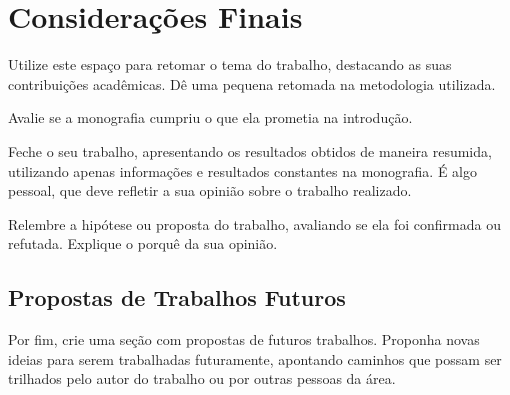 \chapter{Considerações Finais}\label{consideracoesfinais}

Utilize este espaço para retomar o tema do trabalho, destacando as suas contribuições acadêmicas. Dê uma pequena retomada na metodologia utilizada.

Avalie se a monografia cumpriu o que ela prometia na introdução. 

Feche o seu trabalho, apresentando os resultados obtidos de maneira resumida, utilizando apenas informações e resultados constantes na monografia. É algo pessoal, que deve refletir a sua opinião sobre o trabalho realizado.

Relembre a hipótese ou proposta do trabalho, avaliando se ela foi confirmada ou refutada. Explique o porquê da sua opinião.

\section{Propostas de Trabalhos Futuros}

Por fim, crie uma seção com propostas de futuros trabalhos. Proponha novas ideias para serem trabalhadas futuramente, apontando caminhos que possam ser trilhados pelo autor do trabalho ou por outras pessoas da área.
